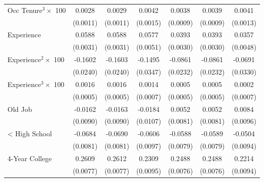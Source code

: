 {\begin{longtable}{l*{6}{c}}
Occ Tenure$^3\times$ 100&      0.0028\sym{***}&      0.0029\sym{***}&      0.0042\sym{***}&      0.0038\sym{***}&      0.0039\sym{***}&      0.0041\sym{***}\\
                    &    (0.0011)         &    (0.0011)         &    (0.0015)         &    (0.0009)         &    (0.0009)         &    (0.0013)         \\
Experience          &      0.0588\sym{***}&      0.0588\sym{***}&      0.0577\sym{***}&      0.0393\sym{***}&      0.0393\sym{***}&      0.0357\sym{***}\\
                    &    (0.0031)         &    (0.0031)         &    (0.0051)         &    (0.0030)         &    (0.0030)         &    (0.0048)         \\
Experience$^2\times$ 100&     -0.1602\sym{***}&     -0.1603\sym{***}&     -0.1495\sym{***}&     -0.0861\sym{***}&     -0.0861\sym{***}&     -0.0691\sym{**} \\
                    &    (0.0240)         &    (0.0240)         &    (0.0347)         &    (0.0232)         &    (0.0232)         &    (0.0330)         \\
Experience$^3\times$ 100&      0.0016\sym{***}&      0.0016\sym{***}&      0.0014\sym{**} &      0.0005         &      0.0005         &      0.0002         \\
                    &    (0.0005)         &    (0.0005)         &    (0.0007)         &    (0.0005)         &    (0.0005)         &    (0.0007)         \\
Old Job             &     -0.0162\sym{*}  &     -0.0163\sym{*}  &     -0.0184\sym{*}  &      0.0052         &      0.0052         &      0.0084         \\
                    &    (0.0090)         &    (0.0090)         &    (0.0107)         &    (0.0081)         &    (0.0081)         &    (0.0096)         \\
< High School       &     -0.0684\sym{***}&     -0.0690\sym{***}&     -0.0606\sym{***}&     -0.0588\sym{***}&     -0.0589\sym{***}&     -0.0504\sym{***}\\
                    &    (0.0081)         &    (0.0081)         &    (0.0097)         &    (0.0079)         &    (0.0079)         &    (0.0094)         \\
4-Year College      &      0.2609\sym{***}&      0.2612\sym{***}&      0.2309\sym{***}&      0.2488\sym{***}&      0.2488\sym{***}&      0.2214\sym{***}\\
                    &    (0.0077)         &    (0.0077)         &    (0.0095)         &    (0.0076)         &    (0.0076)         &    (0.0094)         \\

\end{longtable}}
